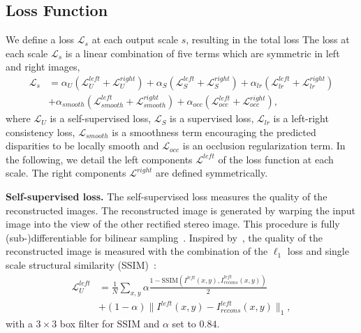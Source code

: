 \documentclass[runningheads]{llncs}
\begin{document}
\subsection{Loss Function}
We define a loss $\mathcal{L}_s$ at each output scale $s$, resulting in the total loss
The loss at each scale $\mathcal{L}_s$ is a linear combination of five terms which are symmetric in left and right images,
\begin{equation}
\begin{split}
\mathcal{L}_s
& = \alpha_{U}\left(\mathcal{L}^{\mathit{left}}_{U} + \mathcal{L}^{\mathit{right}}_{U}\right) + 
\alpha_{S}\left(\mathcal{L}^{\mathit{left}}_{S} + \mathcal{L}^{\mathit{right}}_{S}\right) + 
\alpha_{lr}\left(\mathcal{L}^{\mathit{left}}_{\mathit{lr}} + \mathcal{L}^{\mathit{right}}_{\mathit{lr}}\right) \\
& + \alpha_{\mathit{smooth}}\left(\mathcal{L}^{\mathit{left}}_{\mathit{smooth}} + 
\mathcal{L}^{\mathit{right}}_{\mathit{smooth}}\right)  + \alpha_{\mathit{occ}}\left(\mathcal{L}^{\mathit{left}}_{\mathit{occ}} + 
\mathcal{L}^{\mathit{right}}_{\mathit{occ}}\right),
\end{split}
\label{eq:total_loss_dl}
\end{equation}
where $\mathcal{L}_{U}$ is a self-supervised loss, $\mathcal{L}_{S}$ is a 
supervised loss, $\mathcal{L}_{\mathit{lr}}$ is a left-right consistency loss, 
$\mathcal{L}_{\mathit{smooth}}$ is a smoothness term encouraging the predicted 
disparities to be locally smooth and $\mathcal{L}_{\mathit{occ}}$ is an occlusion 
regularization term.
In the following, we detail the left components $\mathcal{L}^{\mathit{left}}$ of the 
loss function at each 
scale. The right components $\mathcal{L}^{\mathit{right}}$ are defined 
symmetrically.

\textbf{Self-supervised loss.} 
The self-supervised loss measures the quality of the reconstructed images. The 
reconstructed image is generated by warping the input image into the view of the other rectified stereo image. 
This procedure is fully (sub-)differentiable for bilinear sampling~\cite{jaderberg2015spatial}. 
Inspired by~\cite{godard2016unsupervised,zhao2015l2}, the quality of the 
reconstructed image is measured with the combination of the $\ell_1$ loss and 
single scale structural similarity 
(SSIM)~\cite{wang2004image}:  
\begin{equation}
\label{eq:unsup_loss}
\begin{split}
\mathcal{L}_U^{\mathit{left}} & = 
\frac{1}{N}\sum_{x,y}\alpha\frac{1-\text{SSIM}\left(I^{\mathit{left}}(x,y), 
	I^{\mathit{left}}_{\mathit{recons}}(x,y)\right)}{2} \\ & + (1-\alpha)\lVert 
I^{\mathit{left}}(x,y)-I^{\mathit{left}}_{\mathit{recons}}(x,y)\rVert_1,
\end{split}
\end{equation}
with a $3\times3$ box filter for SSIM and $\alpha$ set to $0.84$.
\end{document}
